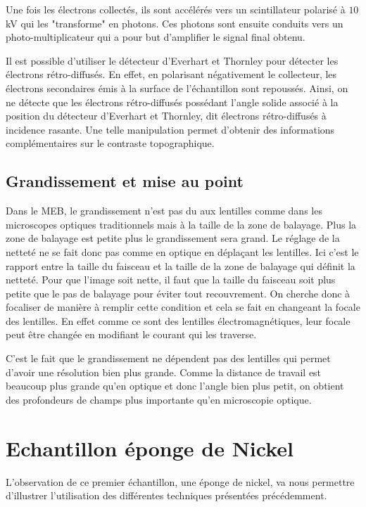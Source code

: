 \documentclass[a4paper,12pt]{article}
\newcommand\ett{Everhart et Thornley\xspace}
\begin{document}
Une fois les électrons collectés, ils sont accélérés vers un scintillateur polarisé à $10$kV qui les "transforme" en photons.
Ces photons sont ensuite conduits vers un photo-multiplicateur qui a pour but d'amplifier le signal final obtenu.


Il est possible d'utiliser le détecteur d'\ett  pour détecter les électrons rétro-diffusés.
En effet, en polarisant négativement le collecteur, les électrons secondaires émis à la surface de l'échantillon sont repoussés.
Ainsi, on ne détecte que les électrons rétro-diffusés possédant l'angle solide associé à la position du détecteur d'\ett, dit électrons rétro-diffusés à incidence rasante.
Une telle manipulation permet d'obtenir des informations complémentaires sur le contraste topographique.


\subsection{Grandissement et mise au point}
Dans le MEB, le grandissement n'est pas du aux lentilles comme dans les microscopes optiques traditionnels mais à la taille de la zone de balayage. Plus la zone de balayage est petite plus le grandissement sera grand. Le réglage de la netteté ne se fait donc pas comme en optique en déplaçant les lentilles. Ici c'est le rapport entre la taille du faisceau et la taille de la zone de balayage qui définit la netteté. Pour que l'image soit nette, il faut que la taille du faisceau soit plus petite que le pas de balayage pour éviter tout recouvrement. On cherche donc à focaliser de manière à remplir cette condition et cela se fait en changeant la focale des lentilles. En effet comme ce sont des lentilles électromagnétiques, leur focale peut être changée en modifiant le courant qui les traverse.


C'est le fait que le grandissement ne dépendent pas des lentilles qui permet d'avoir une résolution bien plus grande. Comme la distance de travail est beaucoup plus grande qu'en optique et donc l'angle bien plus petit, on obtient des profondeurs de champs plus importante qu'en microscopie optique. 



\section{Echantillon éponge de Nickel}

L'observation de ce premier échantillon, une éponge de nickel, va nous permettre d'illustrer l'utilisation des différentes techniques présentées précédemment.
\end{document}
